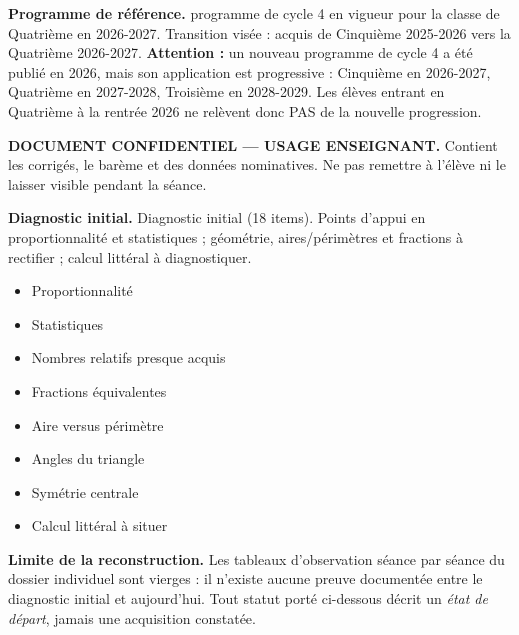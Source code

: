 \documentclass[10pt,a4paper]{article}
\begin{document}
\begin{methodbox}\small\textbf{Programme de référence.} programme de cycle 4 en vigueur pour la classe de Quatrième en 2026-2027. Transition visée : acquis de Cinquième 2025-2026 vers la Quatrième 2026-2027. \textbf{Attention :} un nouveau programme de cycle 4 a été publié en 2026, mais son application est progressive : Cinquième en 2026-2027, Quatrième en 2027-2028, Troisième en 2028-2029. Les élèves entrant en Quatrième à la rentrée 2026 ne relèvent donc PAS de la nouvelle progression.\end{methodbox}
\begin{keybox}\textbf{DOCUMENT CONFIDENTIEL --- USAGE ENSEIGNANT.} Contient les corrigés, le barème et des données nominatives. Ne pas remettre à l'élève ni le laisser visible pendant la séance.\end{keybox}
\begin{methodbox}
\textbf{Diagnostic initial.} Diagnostic initial (18 items). Points d'appui en proportionnalité et statistiques ; géométrie, aires/périmètres et fractions à rectifier ; calcul littéral à diagnostiquer.
\end{methodbox}
\begin{itemize}\item Proportionnalité\item Statistiques\item Nombres relatifs presque acquis\end{itemize}
\begin{itemize}\item Fractions équivalentes\item Aire versus périmètre\item Angles du triangle\item Symétrie centrale\item Calcul littéral à situer\end{itemize}
\begin{warningbox}\textbf{Limite de la reconstruction.} Les tableaux d'observation séance par séance du dossier individuel sont vierges : il n'existe aucune preuve documentée entre le diagnostic initial et aujourd'hui. Tout statut porté ci-dessous décrit un \emph{état de départ}, jamais une acquisition constatée.\end{warningbox}
\end{document}
